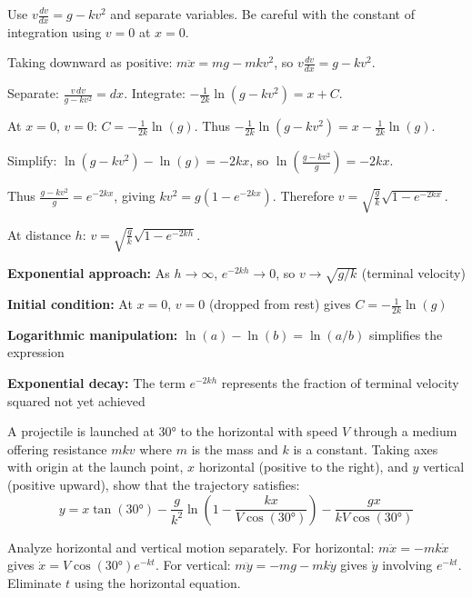 \begin{hint}
Use $v\frac{dv}{dx} = g - kv^2$ and separate variables. Be careful with the constant of integration using $v = 0$ at $x = 0$.
\end{hint}

\begin{solution}
Taking downward as positive: $m\ddot{x} = mg - mkv^2$, so $v\frac{dv}{dx} = g - kv^2$.

Separate: $\frac{v\,dv}{g - kv^2} = dx$. Integrate: $-\frac{1}{2k}\ln(g - kv^2) = x + C$.

At $x = 0$, $v = 0$: $C = -\frac{1}{2k}\ln(g)$. Thus $-\frac{1}{2k}\ln(g - kv^2) = x - \frac{1}{2k}\ln(g)$.

Simplify: $\ln(g - kv^2) - \ln(g) = -2kx$, so $\ln\left(\frac{g - kv^2}{g}\right) = -2kx$.

Thus $\frac{g - kv^2}{g} = e^{-2kx}$, giving $kv^2 = g(1 - e^{-2kx})$. Therefore $v = \sqrt{\frac{g}{k}}\sqrt{1 - e^{-2kx}}$.

At distance $h$: $v = \sqrt{\frac{g}{k}}\sqrt{1 - e^{-2kh}}$.
\end{solution}

\begin{takeaways}
\item \textbf{Exponential approach:} As $h \to \infty$, $e^{-2kh} \to 0$, so $v \to \sqrt{g/k}$ (terminal velocity)
\item \textbf{Initial condition:} At $x = 0$, $v = 0$ (dropped from rest) gives $C = -\frac{1}{2k}\ln(g)$
\item \textbf{Logarithmic manipulation:} $\ln(a) - \ln(b) = \ln(a/b)$ simplifies the expression
\item \textbf{Exponential decay:} The term $e^{-2kh}$ represents the fraction of terminal velocity squared not yet achieved
\end{takeaways}

\begin{problem}
A projectile is launched at $30°$ to the horizontal with speed $V$ through a medium offering resistance $mkv$ where $m$ is the mass and $k$ is a constant. Taking axes with origin at the launch point, $x$ horizontal (positive to the right), and $y$ vertical (positive upward), show that the trajectory satisfies:
\[
y = x\tan(30°) - \frac{g}{k^2}\ln\left(1 - \frac{kx}{V\cos(30°)}\right) - \frac{gx}{kV\cos(30°)}
\]
\end{problem}

\begin{hint}
Analyze horizontal and vertical motion separately. For horizontal: $m\ddot{x} = -mk\dot{x}$ gives $\dot{x} = V\cos(30°)e^{-kt}$. For vertical: $m\ddot{y} = -mg - mk\dot{y}$ gives $\dot{y}$ involving $e^{-kt}$. Eliminate $t$ using the horizontal equation.
\end{hint}

